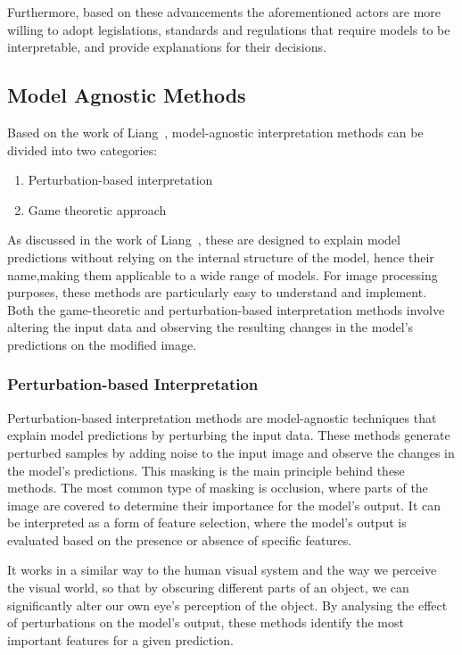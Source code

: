 Furthermore, based on these advancements the aforementioned actors are more willing to adopt legislations, standards
and regulations that require models to be interpretable, and provide explanations for their decisions.


\subsection{Model Agnostic Methods}\label{subsec:model-agnostic-methods}
Based on the work of  Liang~\cite{LIANG2021168}, model-agnostic interpretation methods can be divided into two categories:
\begin{enumerate}
    \item Perturbation-based interpretation
    \item Game theoretic approach
\end{enumerate}

As discussed in the work of Liang~\cite{LIANG2021168}, these are designed to explain model predictions without relying
on the internal structure of the model, hence their name,making them applicable to a wide range of models.
For image processing purposes, these methods are particularly easy to understand and implement.
Both the game-theoretic and perturbation-based interpretation methods involve altering the input data
and observing the resulting changes in the model's predictions on the modified image.

\subsubsection{Perturbation-based Interpretation}\label{subsubsec:pertubation-based-interpretation}

Perturbation-based interpretation methods are model-agnostic techniques that explain model predictions by perturbing the input data.
These methods generate perturbed samples by adding noise to the input image and observe the changes in the model's predictions.
This masking is the main principle behind these methods.
The most common type of masking is occlusion, where parts of the image are covered to determine their importance for the model's output.
It can be interpreted as a form of feature selection, where the model's output is evaluated based on the presence or absence of specific features.

It works in a similar way to the human visual system and the way we perceive the visual world,
so that by obscuring different parts of an object, we can significantly alter our own eye's perception of the object.
By analysing the effect of perturbations on the model's output, these methods identify the most important features for a given prediction.

